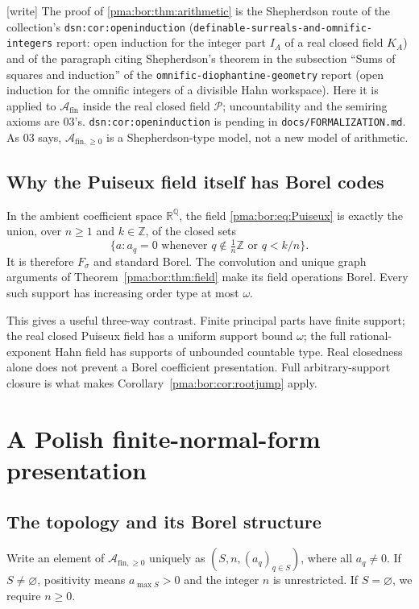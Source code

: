\documentclass[11pt]{article}
\numberwithin{equation}{section}
\theoremstyle{definition}
\theoremstyle{remark}
\newcommand{\Z}{\mathbb Z}
\newcommand{\Q}{\mathbb Q}
\newcommand{\R}{\mathbb R}
\newcommand{\Pui}{\mathcal P}
\newcommand{\A}{\mathcal A_{\mathrm{fin}}}
\newcommand{\PP}{\mathcal A_{\mathrm{fin},\geq 0}}
\newcommand{\writetag}{\textup{\textsf{\small[write]}}}
\newcommand{\replabel}[1]{\nolinkurl{#1}}
\newcommand{\fn}[1]{\nolinkurl{#1}}
\begin{document}
\noindent\writetag{} The proof of \cref{pma:bor:thm:arithmetic} is the
Shepherdson route of the collection's \replabel{dsn:cor:openinduction}
(\fn{definable-surreals-and-omnific-integers} report: open induction for the
integer part $I_A$ of a real closed field $K_A$) and of the paragraph citing
Shepherdson's theorem in the subsection ``Sums of squares and induction'' of
the \fn{omnific-diophantine-geometry} report (open induction for the
omnific integers of a divisible Hahn workspace). Here it is applied to $\A$
inside the real closed field $\Pui$; uncountability and the semiring axioms
are 03's. \replabel{dsn:cor:openinduction} is pending in
\fn{docs/FORMALIZATION.md}. As 03 says, $\PP$ is a Shepherdson-type model, not
a new model of arithmetic.

\subsection{Why the Puiseux field itself has Borel codes}

In the ambient coefficient space $\R^\Q$, the field \eqref{pma:bor:eq:Puiseux} is
exactly the union, over $n\geq1$ and $k\in\Z$, of the closed sets
\[
 \{a:a_q=0\text{ whenever }q\notin\tfrac1n\Z
                  \text{ or }q<k/n\}.
\]
It is therefore $F_\sigma$ and standard Borel. The convolution and unique
graph arguments of Theorem~\ref{pma:bor:thm:field} make its field operations Borel.
Every such support has increasing order type at most $\omega$.

This gives a useful three-way contrast. Finite principal parts have finite
support; the real closed Puiseux field has a uniform support bound $\omega$;
the full rational-exponent Hahn field has supports of unbounded countable
type. Real closedness alone does not prevent a Borel coefficient presentation.
Full arbitrary-support closure is what makes
Corollary~\ref{pma:bor:cor:rootjump} apply.

\section{A Polish finite-normal-form presentation}
\label{pma:bor:sec:topology}

\subsection{The topology and its Borel structure}

Write an element of $\PP$ uniquely as $(S,n,(a_q)_{q\in S})$, where all
$a_q\ne0$. If $S\ne\varnothing$, positivity means
$a_{\max S}>0$ and the integer $n$ is unrestricted. If $S=\varnothing$,
we require $n\geq0$.
\end{document}
